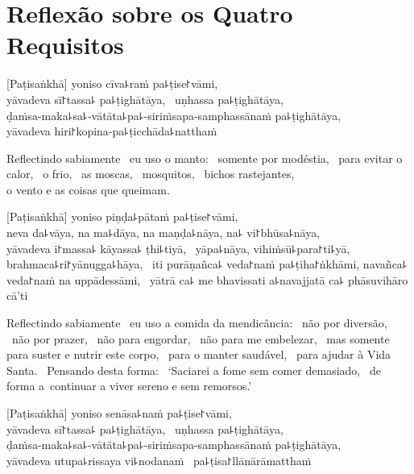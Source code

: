 \chapter[Quatro Requisitos]{Reflexão sobre os Quatro Requisitos}


\begin{leader}
\end{leader}

[Paṭisaṅkhā] yoniso cīva꜕raṁ pa꜕ṭise꜓vāmi, \pause\\
yāvadeva sī꜓tassa꜕ pa꜕ṭighātāya, \pause\ uṇhassa pa꜕ṭighātāya, \pause\\
ḍaṁsa-maka꜕sa꜕-vātāta꜕pa꜕-siriṁsapa-samphassānaṁ pa꜕ṭighātāya, \pause\\
yāvadeva hiri꜓kopina-pa꜕ṭicchāda꜕natthaṁ

\begin{english}
  Reflectindo sabiamente \pause\ eu uso o manto: \pause\ somente por modéstia, \pause\
  para evitar o calor, \pause\ o frio, \pause\ as moscas, \pause\ mosquitos,
  \pause\ bichos rastejantes, \pause\\ o vento e as coisas que queimam.
\end{english}

[Paṭisaṅkhā] yoniso piṇḍa꜕pātaṁ pa꜕ṭise꜓vāmi, \pause\\
neva da꜕vāya, na ma꜕dāya, na maṇḍa꜕nāya, na꜕ vi꜓bhūsa꜕nāya, \pause\\
yāvadeva i꜓massa꜕ kāyassa꜕ ṭhi꜕tiyā, \pause\ yāpa꜕nāya, vihiṁsū꜕para꜓ti꜕yā, \pause\\
brahmaca꜕ri꜓yānugga꜕hāya, \pause\ iti purāṇañca꜕ veda꜓naṁ pa꜕ṭiha꜓ṅkhāmi,
navañca꜕ veda꜓naṁ na uppādessāmi, \pause\ yātrā ca꜕ me bhavissati a꜕navajjatā
ca꜕ phāsuvihāro cā'ti

\begin{english}
  Reflectindo sabiamente \pause\ eu uso a comida da mendicância: \pause\ não por
  diversão, \pause\ não por prazer, \pause\ não para engordar, \pause\ não para
  me embelezar, \pause\ mas somente para suster e nutrir este corpo, \pause\
  para o manter saudável, \pause\ para ajudar à Vida Santa. \pause\ Pensando
  desta forma: \pause\ `Saciarei a fome sem comer demasiado, \pause\ de
  forma a~continuar a viver sereno e sem remorsos.'
\end{english}

\clearpage

[Paṭisaṅkhā] yoniso senāsa꜕naṁ pa꜕ṭise꜓vāmi, \pause\\
yāvadeva sī꜓tassa꜕ pa꜕ṭighātāya, \pause\ uṇhassa pa꜕ṭighātāya, \pause\\
ḍaṁsa-maka꜕sa꜕-vātāta꜕pa꜕-siriṁsapa-samphassānaṁ pa꜕ṭighātāya, \pause\\
yāvadeva utupa꜕rissaya vi꜕nodanaṁ \pause\ pa꜕ṭisa꜓llānārāmatthaṁ

